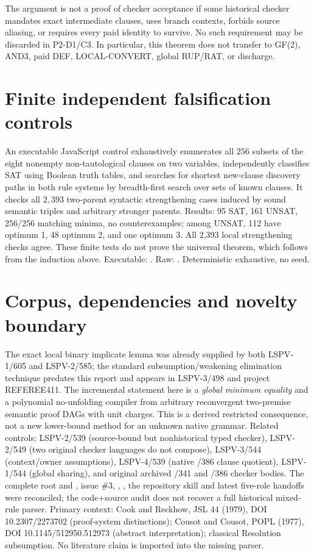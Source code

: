 \documentclass[11pt]{article}
\begin{document}
The argument is not a proof of checker acceptance if some historical checker mandates exact intermediate clauses, uses branch contexts, forbids source aliasing, or requires every paid identity to survive. No such requirement may be discarded in P2-D1/C3. In particular, this theorem does not transfer to GF(2), AND3, paid DEF, LOCAL-CONVERT, global RUP/RAT, or discharge.
\section*{Finite independent falsification controls}
An executable JavaScript control exhaustively enumerates all $256$ subsets of the eight nonempty non-tautological clauses on two variables, independently classifies SAT using Boolean truth tables, and searches for shortest new-clause discovery paths in both rule systems by breadth-first search over sets of known clauses. It checks all $2,393$ two-parent syntactic strengthening cases induced by sound semantic triples and arbitrary stronger parents. Results: 95 SAT, 161 UNSAT, 256/256 matching minima, no counterexamples; among UNSAT, 112 have optimum 1, 48 optimum 2, and one optimum 3. All 2,393 local strengthening checks agree. These finite tests do not prove the universal theorem, which follows from the induction above.
Executable: . Raw: . Deterministic exhaustive, no seed.
\section*{Corpus, dependencies and novelty boundary}
The exact local binary implicate lemma was already supplied by both LSPV-1/605 and LSPV-2/585; the standard subsumption/weakening elimination technique predates this report and appears in LSPV-3/498 and project REFEREE411. The incremental statement here is a \emph{global minimum equality} and a polynomial no-unfolding compiler from arbitrary reconvergent two-premise semantic proof DAGs with unit charges. This is a derived restricted consequence, not a new lower-bound method for an unknown native grammar. Related controls: LSPV-2/539 (source-bound but nonhistorical typed checker), LSPV-2/549 (two original checker languages do not compose), LSPV-3/544 (context/owner assumptions), LSPV-4/539 (native /386 clause quotient), LSPV-1/544 (global sharing), and original archived /341 and /386 checker bodies. The complete root  and , issue \#3, , , the repository skill and latest five-role handoffs were reconciled; the code+source audit does not recover a full historical mixed-rule parser.
Primary context: Cook and Reckhow, JSL 44 (1979), DOI 10.2307/2273702 (proof-system distinctions); Cousot and Cousot, POPL (1977), DOI 10.1145/512950.512973 (abstract interpretation); classical Resolution subsumption. No literature claim is imported into the missing parser.
\end{document}
